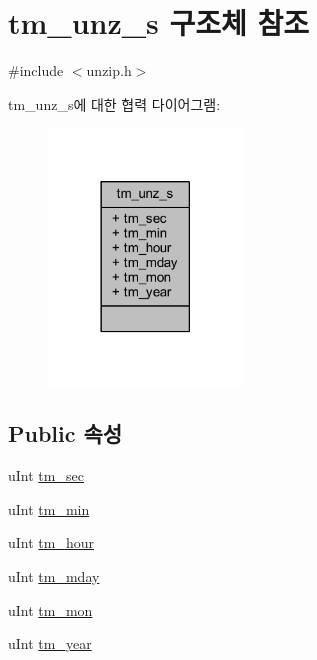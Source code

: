 \hypertarget{structtm__unz__s}{}\section{tm\+\_\+unz\+\_\+s 구조체 참조}
\label{structtm__unz__s}


{\ttfamily \#include $<$unzip.\+h$>$}



tm\+\_\+unz\+\_\+s에 대한 협력 다이어그램\+:\nopagebreak
\begin{figure}[H]
\begin{center}
\leavevmode
\includegraphics[width=146pt]{structtm__unz__s__coll__graph}
\end{center}
\end{figure}
\subsection*{Public 속성}
\begin{DoxyCompactItemize}
\item 
u\+Int \mbox{\hyperlink{structtm__unz__s_ab91e69a9869e5db5be51b1aebaa5ea0d}{tm\+\_\+sec}}
\item 
u\+Int \mbox{\hyperlink{structtm__unz__s_ac5a6bf08a4c5db8ae2243d4f0c35b192}{tm\+\_\+min}}
\item 
u\+Int \mbox{\hyperlink{structtm__unz__s_ada09255f794d6c2db07ef73b77266b9c}{tm\+\_\+hour}}
\item 
u\+Int \mbox{\hyperlink{structtm__unz__s_a51ed1873e1dcabf08ff0f85caf8aefee}{tm\+\_\+mday}}
\item 
u\+Int \mbox{\hyperlink{structtm__unz__s_a4f5e461d8cad18d1aff7ec012168111d}{tm\+\_\+mon}}
\item 
u\+Int \mbox{\hyperlink{structtm__unz__s_a5f17147e3cfbbfdbeb2e29cbc1df8136}{tm\+\_\+year}}
\end{DoxyCompactItemize}


